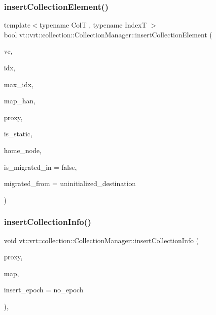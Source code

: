 \subsubsection{\texorpdfstring{insert\+Collection\+Element()}{insertCollectionElement()}}
{\footnotesize\ttfamily template$<$typename ColT , typename IndexT $>$ \\
bool vt\+::vrt\+::collection\+::\+Collection\+Manager\+::insert\+Collection\+Element (\begin{DoxyParamCaption}\item[{\hyperlink{structvt_1_1vrt_1_1collection_1_1_collection_manager_a1da9015e52d6ecca955f57b59aab0b82}{Virtual\+Ptr\+Type}$<$ ColT, IndexT $>$}]{vc,  }\item[{IndexT const \&}]{idx,  }\item[{IndexT const \&}]{max\+\_\+idx,  }\item[{\hyperlink{namespacevt_af64846b57dfcaf104da3ef6967917573}{Handler\+Type} const \&}]{map\+\_\+han,  }\item[{\hyperlink{namespacevt_a1b417dd5d684f045bb58a0ede70045ac}{Virtual\+Proxy\+Type} const \&}]{proxy,  }\item[{bool const}]{is\+\_\+static,  }\item[{\hyperlink{namespacevt_a866da9d0efc19c0a1ce79e9e492f47e2}{Node\+Type} const \&}]{home\+\_\+node,  }\item[{bool const \&}]{is\+\_\+migrated\+\_\+in = {\ttfamily false},  }\item[{\hyperlink{namespacevt_a866da9d0efc19c0a1ce79e9e492f47e2}{Node\+Type} const \&}]{migrated\+\_\+from = {\ttfamily uninitialized\+\_\+destination} }\end{DoxyParamCaption})}

\mbox{\label{structvt_1_1vrt_1_1collection_1_1_collection_manager_a71a055aa5cee6b18891ed946e03e4883}} 
\subsubsection{\texorpdfstring{insert\+Collection\+Info()}{insertCollectionInfo()}}
{\footnotesize\ttfamily void vt\+::vrt\+::collection\+::\+Collection\+Manager\+::insert\+Collection\+Info (\begin{DoxyParamCaption}\item[{\hyperlink{namespacevt_a1b417dd5d684f045bb58a0ede70045ac}{Virtual\+Proxy\+Type} const \&}]{proxy,  }\item[{\hyperlink{namespacevt_af64846b57dfcaf104da3ef6967917573}{Handler\+Type} const \&}]{map,  }\item[{\hyperlink{namespacevt_a985a5adf291c34a3ca263b3378388236}{Epoch\+Type} const \&}]{insert\+\_\+epoch = {\ttfamily no\+\_\+epoch} }\end{DoxyParamCaption})\hspace{0.3cm}{\ttfamily [inline]}, {\ttfamily [protected]}}

